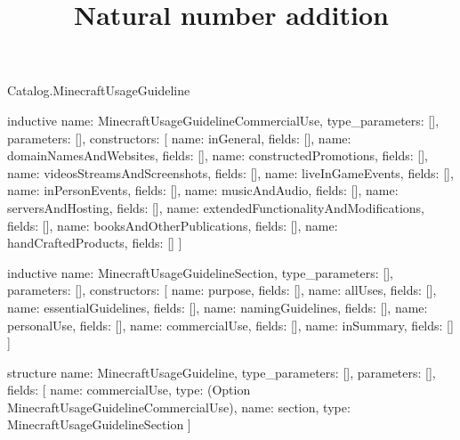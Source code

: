\begin{lexlean}{Catalog.MinecraftUsageGuideline}
\title{Natural number addition}
\begin{semanticmodule}
inductive{
  name: MinecraftUsageGuidelineCommercialUse,
  type_parameters: [],
  parameters: [],
  constructors: [
    {name: inGeneral, fields: []},
    {name: domainNamesAndWebsites, fields: []},
    {name: constructedPromotions, fields: []},
    {name: videosStreamsAndScreenshots, fields: []},
    {name: liveInGameEvents, fields: []},
    {name: inPersonEvents, fields: []},
    {name: musicAndAudio, fields: []},
    {name: serversAndHosting, fields: []},
    {name: extendedFunctionalityAndModifications, fields: []},
    {name: booksAndOtherPublications, fields: []},
    {name: handCraftedProducts, fields: []}
  ]
}

inductive{
  name: MinecraftUsageGuidelineSection,
  type_parameters: [],
  parameters: [],
  constructors: [
    {name: purpose, fields: []},
    {name: allUses, fields: []},
    {name: essentialGuidelines, fields: []},
    {name: namingGuidelines, fields: []},
    {name: personalUse, fields: []},
    {name: commercialUse, fields: []},
    {name: inSummary, fields: []}
  ]
}

structure{
  name: MinecraftUsageGuideline,
  type_parameters: [],
  parameters: [],
  fields: [
    {name: commercialUse, type: (Option MinecraftUsageGuidelineCommercialUse)},
    {name: section, type: MinecraftUsageGuidelineSection}
  ]
}
\end{semanticmodule}
\end{lexlean}
